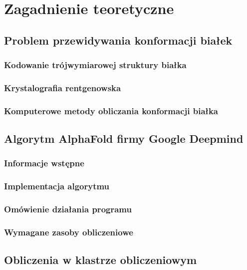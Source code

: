 \chapter{Zagadnienie teoretyczne}


\section{Problem przewidywania konformacji białek}

\subsection{Kodowanie trójwymiarowej struktury białka}

\subsection{Krystalografia rentgenowska}

\subsection{Komputerowe metody obliczania konformacji białka}


\section{Algorytm AlphaFold firmy Google Deepmind}

\subsection{Informacje wstępne}

\subsection{Implementacja algorytmu}

\subsection{Omówienie działania programu}

\subsection{Wymagane zasoby obliczeniowe}


\section{Obliczenia w klastrze obliczeniowym}

